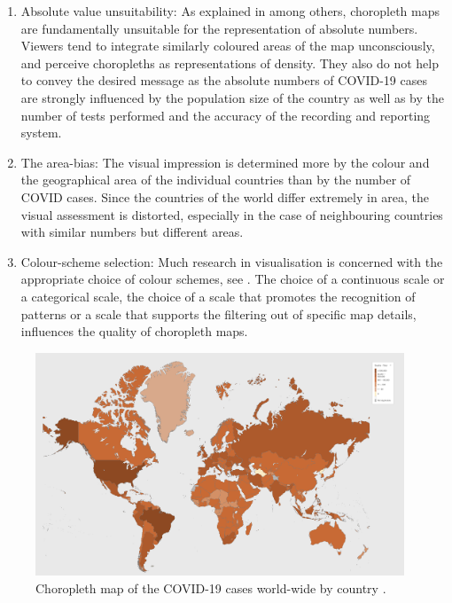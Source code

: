 \documentclass[article]{jdssv}\usepackage[]{graphicx}\usepackage[]{xcolor}
\begin{document}
\begin{enumerate}
\item Absolute value unsuitability: As explained in \citep{monmonier2005, slocum2008, speckmann2010} among others, choropleth maps are fundamentally unsuitable for the representation of absolute numbers. Viewers tend to integrate similarly coloured areas of the map unconsciously, and perceive choropleths as representations of density. They also do not help to convey the desired message as the absolute numbers of COVID-19 cases are strongly influenced by the population size of the country as well as by the number of tests performed and the accuracy of the recording and reporting system. 
\item The area-bias: The visual impression is determined more by the colour and the geographical area of the individual countries than by the number of COVID cases. Since the countries of the world differ extremely in area, the visual assessment is distorted, especially in the case of neighbouring countries with similar numbers but different areas.
\item Colour-scheme selection: Much research in visualisation is concerned with the appropriate choice of colour schemes, see \citep{brewer1997, color2021}. The choice of a continuous scale or a categorical scale, the choice of a scale that promotes the recognition of patterns or a scale that supports the filtering out of specific map details, influences the quality of choropleth maps.
\end{enumerate}

\begin{figure}
	\includegraphics[width = 0.98\textwidth]{Figures_Web/who_totalcases_choro.png}
	\caption{Choropleth map of the COVID-19 cases world-wide by country \citep{WHOCoronavirusCOVID19}.}
	\label{fig:choro1}
\end{figure}
\end{document}
